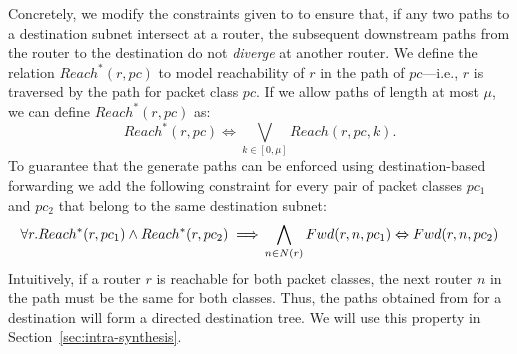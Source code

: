 Concretely, we modify the constraints given to \genesis to ensure that,
if any two paths to a destination subnet intersect at a router,
the subsequent downstream paths from the router to the destination 
 do not \emph{diverge} at another router.  
We define the relation $Reach^*(r,pc)$ to model reachability 
of $r$ in the path of $pc$---i.e., $r$ is traversed by the path for packet class $pc$. 
If we allow paths of length at most $\mu$, we can define $Reach^*(r,pc)$ as:
\begin{equation}
	Reach^*(r,pc) \Leftrightarrow \bigvee_{k \in [0, \mu]} Reach(r, pc, k).
\end{equation}
To guarantee that the generate paths can be enforced using destination-based
forwarding we add
the following constraint for every pair of packet classes $pc_1$ and $pc_2$ that belong to the same 
 destination subnet:
 \begin{equation}
 \forall r. Reach^*(r, pc_1) \wedge Reach^*(r, pc_2) 
 \implies \\ \bigwedge_{n \in N(r)} Fwd(r, n, pc_1) \Leftrightarrow Fwd(r, n, pc_2)
 \end{equation}
Intuitively, 
 if a router $r$ is reachable for both packet classes, 
the next router $n$ in the path must be the same for both classes. Thus, the paths obtained
 from \genesis for a destination will form a 
 directed destination tree.
 We will use this property in Section~\ref{sec:intra-synthesis}. 


